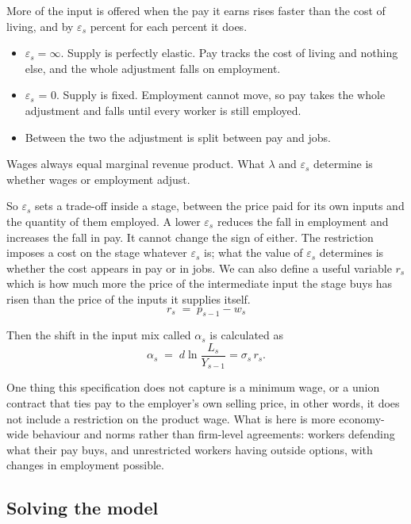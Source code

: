 \documentclass[11pt,a4paper]{article}
\begin{document}
More of the input is offered when the pay it earns rises faster than the cost of living, and by $\varepsilon_s$ percent for each percent it does.

\begin{itemize}\itemsep2pt
\item $\varepsilon_s = \infty$. Supply is perfectly elastic. Pay tracks the cost of living and nothing else, and the whole adjustment falls on employment.
\item $\varepsilon_s$ = 0. Supply is fixed. Employment cannot move, so pay takes the whole adjustment and falls until every worker is still employed.
\item Between the two the adjustment is split between pay and jobs.
\end{itemize}

Wages always equal marginal revenue product. What $\lambda$ and $\varepsilon_s$ determine is whether wages or employment adjust.

So $\varepsilon_s$ sets a trade-off inside a stage, between the price paid for its own inputs and the quantity of them employed. A lower $\varepsilon_s$ reduces the fall in employment and increases the fall in pay. It cannot change the sign of either. The restriction imposes a cost on the stage whatever $\varepsilon_s$ is; what the value of $\varepsilon_s$ determines is whether the cost appears in pay or in jobs.
We can also define a useful variable $r_s$ which is how much more the price of the intermediate input the stage buys has risen than the price of the inputs it supplies itself.
\begin{equation}
r_s \;=\; p_{s-1} - w_s
\label{eq:rdef}
\end{equation}

Then the shift in the input mix called $\alpha_s$ is calculated as
\begin{equation}
\alpha_s  \;=\; d \ln \frac{L_s}{Y_{s-1}}=\sigma_s \, r_s  .
\end{equation}

One thing this specification does not capture is a minimum wage, or a union contract that ties pay to the employer's own selling price, in other words, it does not include a restriction on the product wage. What is here is more economy-wide behaviour and norms rather than firm-level agreements: workers defending what their pay buys, and unrestricted workers having outside options, with changes in employment possible.


\subsection{Solving the model}
\label{sec:solving}
\end{document}
